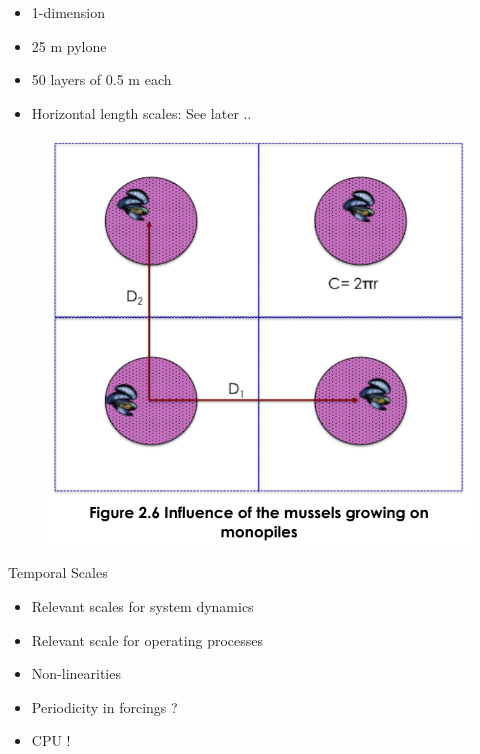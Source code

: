 \documentclass[final,xcolor=dvipsnames]{beamer}
\begin{document}
\begin{frame}
\begin{exampleblock}{}
\begin{itemize}
    \item 1-dimension
    \item 25 m pylone
    \item 50 layers of 0.5 m each
    \item Horizontal length scales: See later ..
\end{itemize} 
\begin{figure}
    \centering
    \includegraphics[width=0.3\framewidth]{Figs/HorizontalL.png}
    \label{fig:HL}
\end{figure}
\end{exampleblock}
\end{frame}

\begin{frame}
\begin{block}{Temporal Scales}
\begin{itemize}[<+->]
    \item Relevant scales for system dynamics
    \item Relevant scale for operating processes
    \item Non-linearities
    \item Periodicity in forcings ?  
    \item CPU ! 
\end{itemize}
\end{block}

\end{frame}
\end{document}
